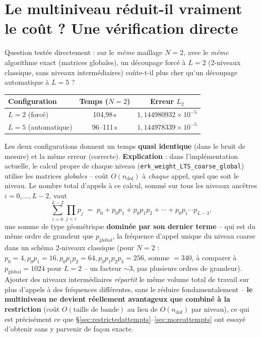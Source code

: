 \documentclass[11pt]{article}
\begin{document}
\section{Le multiniveau réduit-il vraiment le coût ? Une vérification directe}
\label{sec:l2vsl5}

Question testée directement : sur le \emph{même} maillage $N=2$, avec le
\emph{même} algorithme exact (matrices globales), un découpage forcé à
$L=2$ (2-niveaux classique, sans niveaux intermédiaires) coûte-t-il plus
cher qu'un découpage automatique à $L=5$ ?

\begin{center}
\begin{tabular}{@{}lcc@{}}
\toprule
Configuration & Temps ($N=2$) & Erreur $L_2$ \\
\midrule
$L=2$ (forcé) & 104,98\,s & $1{,}144980932\times10^{-5}$ \\
$L=5$ (automatique) & 96--111\,s & $1{,}144978339\times10^{-5}$ \\
\bottomrule
\end{tabular}
\end{center}

Les deux configurations donnent un temps \textbf{quasi identique} (dans
le bruit de mesure) et la même erreur (correcte). \textbf{Explication} :
dans l'implémentation actuelle, le calcul \og propre \fg{} de chaque
niveau (\texttt{erk\_weight\_LTS\_coarse\_global}) utilise les matrices
\emph{globales} -- coût $O(n_{\text{dof}})$ à \emph{chaque} appel, quel
que soit le niveau. Le nombre total d'appels à ce calcul, sommé sur tous
les niveaux ancêtres $i=0,\dots,L-2$, vaut
\[
  \sum_{i=0}^{L-2} \prod_{j<i} p_j \;=\; p_0 + p_0 p_1 + p_0 p_1 p_2 + \cdots + p_0 p_1 \cdots p_{L-3} ,
\]
une somme de type géométrique \textbf{dominée par son dernier terme} --
qui est du même ordre de grandeur que $p_{\text{global}}$, la fréquence
d'appel unique du niveau coarse dans un schéma 2-niveaux classique
(pour $N=2$ : $p_0{=}4, p_0p_1{=}16, p_0p_1p_2{=}64, p_0p_1p_2p_3{=}256$,
somme $=340$, à comparer à $p_{\text{global}}{=}1024$ pour $L=2$ --
un facteur $\sim$3, pas plusieurs ordres de grandeur). Ajouter des
niveaux intermédiaires \emph{répartit} le même volume total de travail
sur plus d'appels à des fréquences différentes, sans le réduire
fondamentalement -- \textbf{le multiniveau ne devient réellement
avantageux que combiné à la restriction} (coût $O(\text{taille de
bande})$ au lieu de $O(n_{\text{dof}})$ par niveau), ce qui est
précisément ce que \S\ref{sec:restrictedattempts}--\ref{sec:moreattempts}
ont essayé d'obtenir sans y parvenir de façon exacte.
\end{document}
